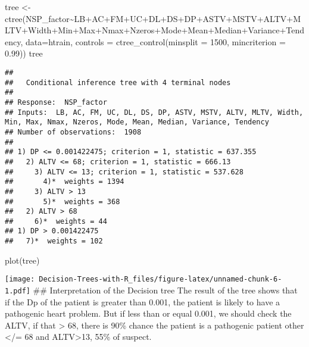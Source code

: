 \documentclass[
]{article}
\newenvironment{Shaded}{\begin{snugshade}}{\end{snugshade}}
\newcommand{\AttributeTok}[1]{\textcolor[rgb]{0.77,0.63,0.00}{#1}}
\newcommand{\DecValTok}[1]{\textcolor[rgb]{0.00,0.00,0.81}{#1}}
\newcommand{\FloatTok}[1]{\textcolor[rgb]{0.00,0.00,0.81}{#1}}
\newcommand{\FunctionTok}[1]{\textcolor[rgb]{0.00,0.00,0.00}{#1}}
\newcommand{\NormalTok}[1]{#1}
\newcommand{\OtherTok}[1]{\textcolor[rgb]{0.56,0.35,0.01}{#1}}
\newcommand{\SpecialCharTok}[1]{\textcolor[rgb]{0.00,0.00,0.00}{#1}}
\begin{document}
\begin{Shaded}
\begin{Highlighting}[]
\NormalTok{tree }\OtherTok{\textless{}{-}} \FunctionTok{ctree}\NormalTok{(NSP\_factor}\SpecialCharTok{\textasciitilde{}}\NormalTok{LB}\SpecialCharTok{+}\NormalTok{AC}\SpecialCharTok{+}\NormalTok{FM}\SpecialCharTok{+}\NormalTok{UC}\SpecialCharTok{+}\NormalTok{DL}\SpecialCharTok{+}\NormalTok{DS}\SpecialCharTok{+}\NormalTok{DP}\SpecialCharTok{+}\NormalTok{ASTV}\SpecialCharTok{+}\NormalTok{MSTV}\SpecialCharTok{+}\NormalTok{ALTV}\SpecialCharTok{+}\NormalTok{MLTV}\SpecialCharTok{+}\NormalTok{Width}\SpecialCharTok{+}\NormalTok{Min}\SpecialCharTok{+}\NormalTok{Max}\SpecialCharTok{+}\NormalTok{Nmax}\SpecialCharTok{+}\NormalTok{Nzeros}\SpecialCharTok{+}\NormalTok{Mode}\SpecialCharTok{+}\NormalTok{Mean}\SpecialCharTok{+}\NormalTok{Median}\SpecialCharTok{+}\NormalTok{Variance}\SpecialCharTok{+}\NormalTok{Tendency, }\AttributeTok{data=}\NormalTok{htrain, }\AttributeTok{controls =} \FunctionTok{ctree\_control}\NormalTok{(}\AttributeTok{minsplit =} \DecValTok{1500}\NormalTok{, }\AttributeTok{mincriterion =} \FloatTok{0.99}\NormalTok{))}
\NormalTok{tree}
\end{Highlighting}
\end{Shaded}

\begin{verbatim}
## 
##   Conditional inference tree with 4 terminal nodes
## 
## Response:  NSP_factor 
## Inputs:  LB, AC, FM, UC, DL, DS, DP, ASTV, MSTV, ALTV, MLTV, Width, Min, Max, Nmax, Nzeros, Mode, Mean, Median, Variance, Tendency 
## Number of observations:  1908 
## 
## 1) DP <= 0.001422475; criterion = 1, statistic = 637.355
##   2) ALTV <= 68; criterion = 1, statistic = 666.13
##     3) ALTV <= 13; criterion = 1, statistic = 537.628
##       4)*  weights = 1394 
##     3) ALTV > 13
##       5)*  weights = 368 
##   2) ALTV > 68
##     6)*  weights = 44 
## 1) DP > 0.001422475
##   7)*  weights = 102
\end{verbatim}

\begin{Shaded}
\begin{Highlighting}[]
\FunctionTok{plot}\NormalTok{(tree)}
\end{Highlighting}
\end{Shaded}

\texttt{[image: Decision-Trees-with-R\_files/figure-latex/unnamed-chunk-6-1.pdf]}
\#\# Interpretation of the Decision tree The result of the tree shows
that if the Dp of the patient is greater than 0.001, the patient is
likely to have a pathogenic heart problem. But if less than or equal
0.001, we should check the ALTV, if that \textgreater{} 68, there is
90\% chance the patient is a pathogenic patient other \textless/= 68 and
ALTV\textgreater13, 55\% of suspect.
\end{document}
